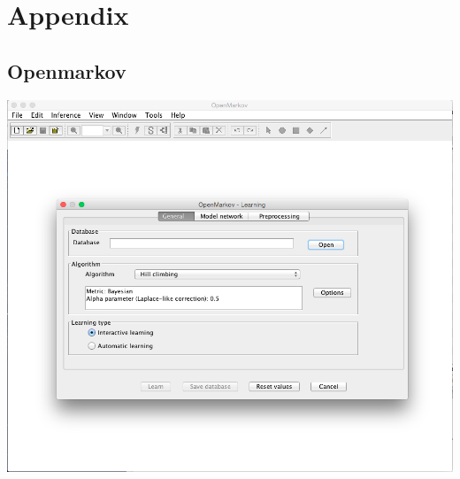 \renewcommand{\thesubsection}{ \Alph{subsection}}

\section*{Appendix}

\subsection{Openmarkov}\label{org.openmarkov}

\begin{center}
	\includegraphics[width=1.00\textwidth]{content/pictures/openmarcov.png}
\end{center}
\pagebreak

